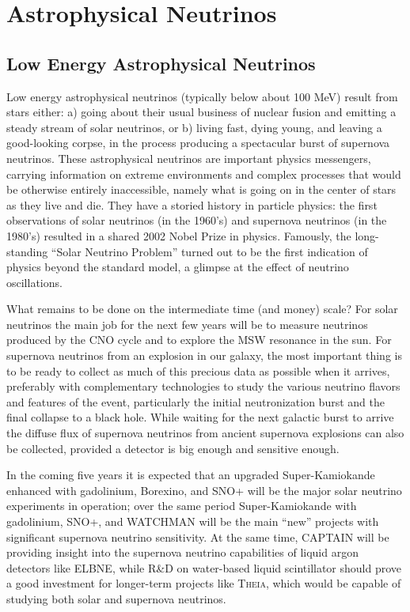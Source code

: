 \section{Astrophysical Neutrinos}
\label{sec:Astrophysical}

\subsection{Low Energy Astrophysical Neutrinos}
\label{sec:Astrophysical_low}

Low energy astrophysical neutrinos (typically below about 100 MeV)
result from stars either: a) going about their usual business of
nuclear fusion and emitting a steady stream of solar neutrinos, or b)
living fast, dying young, and leaving a good-looking corpse, in the
process producing a spectacular burst of supernova neutrinos. These
astrophysical neutrinos are important physics messengers, carrying
information on extreme environments and complex processes that would
be otherwise entirely inaccessible, namely what is going on in the
center of stars as they live and die. They have a storied history in
particle physics: the first observations of solar neutrinos (in the
1960's) and supernova neutrinos (in the 1980's) resulted in a shared
2002 Nobel Prize in physics. Famously, the long-standing ``Solar
Neutrino Problem'' turned out to be the first indication of physics
beyond the standard model, a glimpse at the effect of neutrino
oscillations.

What remains to be done on the intermediate time (and money) scale?
For solar neutrinos the main job for the next few years will be to
measure neutrinos produced by the CNO cycle and to explore the MSW
resonance in the sun. For supernova neutrinos from an explosion in our
galaxy, the most important thing is to be ready to collect as much of
this precious data as possible when it arrives, preferably with
complementary technologies to study the various neutrino flavors
and features of the event, particularly the initial neutronization
burst and the final collapse to a black hole. While waiting for the
next galactic burst to arrive the diffuse flux of supernova neutrinos
from ancient supernova explosions can also be collected, provided a
detector is big enough and sensitive enough.

In the coming five years it is expected that an upgraded
Super-Kamiokande enhanced with gadolinium, Borexino, and SNO+ will be
the major solar neutrino experiments in operation; over the same
period Super-Kamiokande with gadolinium, SNO+, and WATCHMAN will be
the main ``new'' projects with significant supernova neutrino
sensitivity. At the same time, CAPTAIN will be providing insight into
the supernova neutrino capabilities of liquid argon detectors like
ELBNE, while R\&D on water-based liquid scintillator should prove a
good investment for longer-term projects like \textsc{Theia}, which would be
capable of studying both solar and supernova neutrinos.

